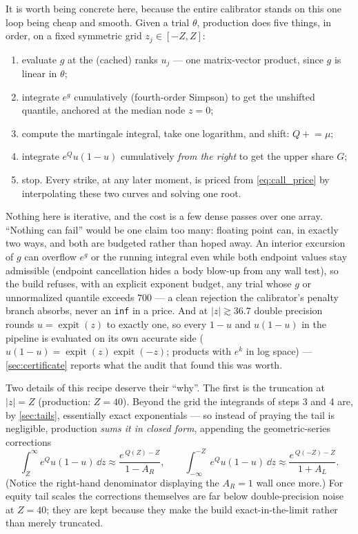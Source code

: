 \documentclass[11pt]{article}
\begin{document}
It is worth being concrete here, because the entire calibrator stands on
this one loop being cheap and smooth.  Given a trial $\theta$, production
does five things, in order, on a fixed symmetric grid $z_j\in[-Z,Z]$:
\begin{enumerate}[leftmargin=1.6em]
\item evaluate $g$ at the (cached) ranks $u_j$ --- one matrix-vector
product, since $g$ is linear in $\theta$;
\item integrate $e^{g}$ cumulatively (fourth-order Simpson) to get the
unshifted quantile, anchored at the median node $z=0$;
\item compute the martingale integral, take one logarithm, and shift:
$Q\mathrel{+}=\mu$;
\item integrate $e^{Q}u(1-u)$ cumulatively \emph{from the right} to get the
upper share $G$;
\item stop.  Every strike, at any later moment, is priced from
\eqref{eq:call_price} by interpolating these two curves and solving one
root.
\end{enumerate}
Nothing here is iterative, and the cost is a few dense passes over one
array.  ``Nothing can fail'' would be one claim too many: floating point
can, in exactly two ways, and both are budgeted rather than hoped away.
An interior excursion of $g$ can overflow $e^{g}$ or the running integral
even while both endpoint values stay admissible (endpoint cancellation hides
a body blow-up from any wall test), so the build refuses, with an explicit
exponent budget, any trial whose $g$ or unnormalized quantile exceeds
$700$ --- a clean rejection the calibrator's penalty branch absorbs, never
an \texttt{inf} in a price.  And at $|z|\gtrsim36.7$ double precision rounds
$u=\operatorname{expit}(z)$ to exactly one, so every $1-u$ and $u(1-u)$ in
the pipeline is evaluated on its own accurate side
($u(1-u)=\operatorname{expit}(z)\operatorname{expit}(-z)$; products with
$e^{k}$ in log space) --- \cref{sec:certificate} reports what the audit that
found this was worth.

Two details of this recipe deserve their ``why''.  The first is the
truncation at $|z|=Z$ (production: $Z=40$).  Beyond the grid the integrands
of steps 3 and 4 are, by \cref{sec:tails}, essentially exact exponentials
--- so instead of praying the tail is negligible, production \emph{sums it
in closed form}, appending the geometric-series corrections
\begin{equation}
\int_{Z}^{\infty}e^{Q}u(1-u)\,\dd z\approx\frac{e^{\,Q(Z)-Z}}{1-A_R},
\qquad
\int_{-\infty}^{-Z}e^{Q}u(1-u)\,\dd z\approx\frac{e^{\,Q(-Z)-Z}}{1+A_L}.
\label{eq:tail_corr}
\end{equation}
(Notice the right-hand denominator displaying the $A_R=1$ wall once more.)
For equity tail scales the corrections themselves are far below
double-precision noise at $Z=40$; they are kept because they make the build
exact-in-the-limit rather than merely truncated.
\end{document}
